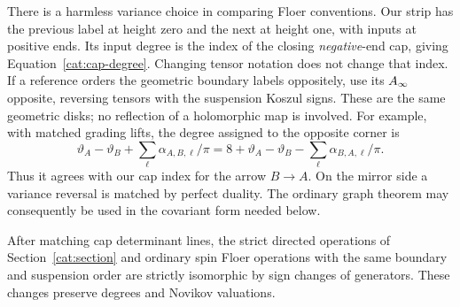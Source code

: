 There is a harmless variance choice in comparing Floer conventions.
Our strip has the previous label at height zero and the next at height
one, with inputs at positive ends.  Its input degree is the index of
the closing \emph{negative}-end cap, giving
Equation~\eqref{cat:cap-degree}.  Changing tensor notation does not
change that index.  If a reference orders the geometric boundary
labels oppositely, use its \(A_\infty\) opposite, reversing tensors with
the suspension Koszul signs.  These are the same geometric disks;
no reflection of a holomorphic map is involved.  For example, with
matched grading lifts, the degree assigned to the opposite corner is
\[
 \vartheta_A-\vartheta_B
       +\sum_\ell\alpha_{A,B,\ell}/\pi
 =8+\vartheta_A-\vartheta_B
       -\sum_\ell\alpha_{B,A,\ell}/\pi.
\]
Thus it agrees with our cap index for the arrow \(B\to A\).
On the mirror side a variance reversal is matched by perfect duality.
The ordinary graph theorem may consequently be used in the
covariant form needed below.

\begin{lemma}\label{cat:sign-comparison}
After matching cap determinant lines, the strict directed operations
of Section~\ref{cat:section} and ordinary spin Floer operations with
the same boundary and suspension order are strictly isomorphic by
sign changes of generators.  These changes preserve degrees and
Novikov valuations.
\end{lemma}

